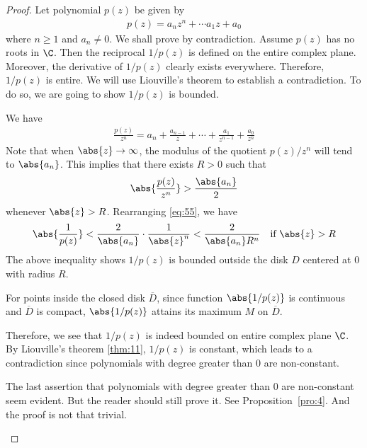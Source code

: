 \documentclass[thmcnt=section, color=cyan, 12pt]{my-elegantbook}
\begin{document}
\begin{proof}
    Let polynomial $p(z)$ be given by
    \begin{align*}
        p(z) = a_n z^n + \cdots a_1 z + a_0
    \end{align*}
    where $n \geq 1$ and $a_n \neq 0$.
    We shall prove by contradiction.
    Assume $p(z)$ has no roots in $\C$. Then the reciprocal $1 / p(z)$ is defined on the entire
    complex plane.
    Moreover, the derivative of $1 / p(z)$ clearly exists everywhere.
    Therefore, $1 / p(z)$ is entire.
    We will use Liouville's theorem to establish a contradiction.
    To do so, we are going to show $1 / p(z)$ is bounded.

    We have
    \begin{align*}
        \frac{p(z)}{z^n} = a_n + \frac{a_{n-1}}{z} + \cdots + \frac{a_1}{z^{n-1}} + \frac{a_0}{z^n}
    \end{align*}
    Note that when $\abs{z} \to \infty$, the modulus of the quotient $p(z) / z^n$ will
    tend to $\abs{a_n}$.
    This implies that there exists $R > 0$ such that
    \begin{align}
        \abs{\frac{p(z)}{z^n}} > \frac{\abs{a_n}}{2}
        \label{eq:55}
    \end{align}
    whenever $\abs{z} > R$. Rearranging \eqref{eq:55}, we have
    \begin{align*}
        \abs{\frac{1}{p(z)}} < \frac{2}{\abs{a_n}} \cdot \frac{1}{\abs{z}^n} < \frac{2}{\abs{a_n} R^n} \quad \text{if } \abs{z} > R
    \end{align*}
    The above inequality shows $1 / p(z)$ is bounded outside the disk $D$ centered
    at $0$ with radius $R$.

    For points inside the closed disk $\overline{D}$, since function $\abs{1 / p(z)}$ is
    continuous and $\overline{D}$ is compact, $\abs{1 / p(z)}$ attains its maximum $M$ on $\overline{D}$.

    Therefore, we see that $1 / p(z)$ is indeed bounded on entire complex plane $\C$.
    By Liouville's theorem \ref{thm:11}, $1 / p(z)$ is constant, which leads to a
    contradiction since polynomials with degree greater than $0$ are non-constant.


    \begin{note}
        The last assertion that polynomials with degree greater than $0$ are
        non-constant seem evident. But the reader should still prove it. See Proposition~\ref{pro:4}.
        And the proof is not that trivial.
    \end{note}
\end{proof}
\end{document}

